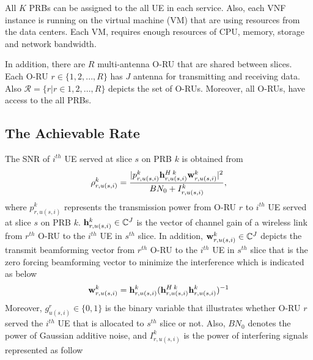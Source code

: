 \documentclass[conference]{IEEEtran}
\begin{document}
All $K$ PRBs can be assigned to the all UE in each service.
Also, each VNF instance is running on the virtual machine (VM) that are using resources from the data centers. Each VM, requires enough resources of CPU, memory, storage and network bandwidth.

In addition, there are $R$ multi-antenna O-RU that are shared between slices. Each O-RU $r \in \{1,2,...,R \}$
has $J$ antenna for transmitting and receiving data.
Also $\mathcal{R} = \{ r | r\in 1,2,...,R \}$ depicts the set of O-RUs.
Moreover, all O-RUs, have access to the all PRBs.
\subsection{The Achievable Rate}
The SNR of $i^{th}$ UE served at slice $s$ on PRB $k$ is obtained from
\begin{equation}\label{eq1}
\rho_{r,u(s,i)}^{k} =  \frac{|p_{r,u(s,i)}^{k}{\bold{h}_{r,u(s,i)}^{H \: k}} \bold{w}_{r,u(s,i)}^{k}|^2}{BN_0 + I_{r,u(s,i)}^{k}},
\end{equation} 
where $p_{r,u(s,i)}^{k}$ represents the transmission power from O-RU $r$ to $i^{th}$ UE served at slice $s$ on PRB $k$. 
${\bold{h}_{r,u(s,i)}^{k}} \in \mathbb{C}^{J}$ is the vector of channel gain of a wireless link from 
$r^{th}$ O-RU to the $i^{th}$ UE in $s^{th}$ slice. In addition, $\bold{w}_{r,u(s,i)}^{k} \in \mathbb{C}^{J}$ depicts the  transmit beamforming vector from $r^{th}$ O-RU to the $i^{th}$ UE in $s^{th}$ slice that is the zero forcing beamforming vector to minimize the interference which is indicated as below
\begin{equation}
\bold{w}_{r,u(s,i)}^{k} = {\bold{h}_{r,u(s,i)}^{k}}({\bold{h}_{r,u(s,i)}^{H \: k}} {\bold{h}_{r,u(s,i)}^{k}})^{-1}
\end{equation}
Moreover, $g_{u(s,i)}^r \in \{0,1\}$ is the binary variable that illustrates whether O-RU $r$ served the $i^{th}$ UE that is allocated to $s^{th}$ slice or not. 
Also, $BN_0$ denotes the power of Gaussian additive noise, and $I_{r,u(s,i)}^{k}$ is the power of interfering signals represented as follow
\end{document}
